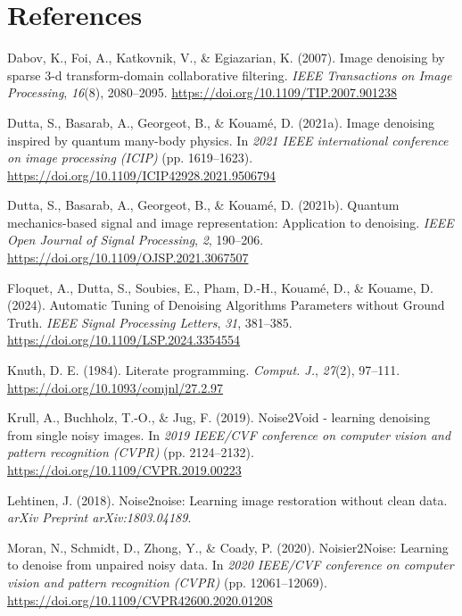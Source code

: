 \documentclass[
]{agujournal2019}
\newlength{\cslhangindent}
\newenvironment{CSLReferences}[2] %
 {\begin{list}{}{%
  \setlength{\itemindent}{0pt}
  \setlength{\leftmargin}{0pt}
  \setlength{\parsep}{0pt}
  \ifodd #1
   \setlength{\leftmargin}{\cslhangindent}
   \setlength{\itemindent}{-1\cslhangindent}
  \fi
  \setlength{\itemsep}{#2\baselineskip}}}
 {\end{list}}
\begin{document}
\section{References}\label{references}

\label{refs}
\begin{CSLReferences}{1}{0}
\vspace{1em}

Dabov, K., Foi, A., Katkovnik, V., \& Egiazarian, K. (2007). Image
denoising by sparse 3-d transform-domain collaborative filtering.
\emph{IEEE Transactions on Image Processing}, \emph{16}(8), 2080--2095.
\url{https://doi.org/10.1109/TIP.2007.901238}

Dutta, S., Basarab, A., Georgeot, B., \& Kouamé, D. (2021a). Image
denoising inspired by quantum many-body physics. In \emph{2021 IEEE
international conference on image processing (ICIP)} (pp. 1619--1623).
\url{https://doi.org/10.1109/ICIP42928.2021.9506794}

Dutta, S., Basarab, A., Georgeot, B., \& Kouamé, D. (2021b). Quantum
mechanics-based signal and image representation: Application to
denoising. \emph{IEEE Open Journal of Signal Processing}, \emph{2},
190--206. \url{https://doi.org/10.1109/OJSP.2021.3067507}

Floquet, A., Dutta, S., Soubies, E., Pham, D.-H., Kouamé, D., \& Kouame,
D. (2024). {Automatic Tuning of Denoising Algorithms Parameters without
Ground Truth}. \emph{{IEEE Signal Processing Letters}}, \emph{31},
381--385. \url{https://doi.org/10.1109/LSP.2024.3354554}

Knuth, D. E. (1984). Literate programming. \emph{Comput. J.},
\emph{27}(2), 97--111. \url{https://doi.org/10.1093/comjnl/27.2.97}

Krull, A., Buchholz, T.-O., \& Jug, F. (2019). Noise2Void - learning
denoising from single noisy images. In \emph{2019 IEEE/CVF conference on
computer vision and pattern recognition (CVPR)} (pp. 2124--2132).
\url{https://doi.org/10.1109/CVPR.2019.00223}

Lehtinen, J. (2018). Noise2noise: Learning image restoration without
clean data. \emph{arXiv Preprint arXiv:1803.04189}.

Moran, N., Schmidt, D., Zhong, Y., \& Coady, P. (2020). Noisier2Noise:
Learning to denoise from unpaired noisy data. In \emph{2020 IEEE/CVF
conference on computer vision and pattern recognition (CVPR)} (pp.
12061--12069). \url{https://doi.org/10.1109/CVPR42600.2020.01208}


\end{CSLReferences}
\end{document}
